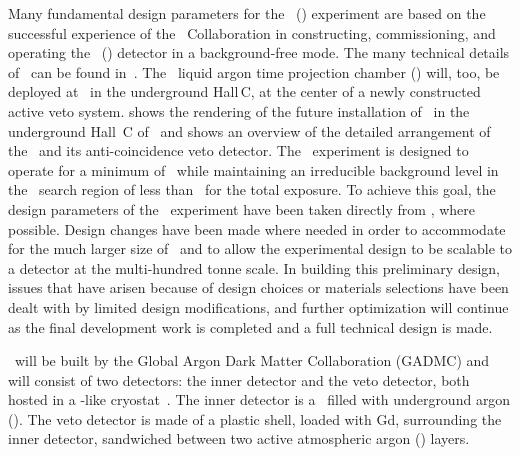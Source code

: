 Many fundamental design parameters for the \DSk\ (\DSks) experiment are based on the successful experience of the \DS\ Collaboration in constructing, commissioning, and operating the \DSf\ (\DSfs) detector in a background-free mode. The many technical details of \DSf\ can be found in~\cite{Agnes:2015gu,Agnes:2016cp,Agnes:2016fw,Agnes:2016fz,Agnes:2016tx,Agnes:2017ck,Agnes:2017cl,Agnes:2017cz,Agnes:2017ec,Agnes:2018cn,Agnes:2018dt,Agnes:2018ep,Agnes:2018fg,Agnes:2018ft}.  The \DSks\ liquid argon time projection chamber (\LArTPC) will, too, be deployed at \LNGS\ in the underground Hall\,C, at the center of a newly constructed active veto system.   shows the rendering of the future installation of \DSks\ in the underground Hall~C of \LNGS\ and  shows an overview of the detailed arrangement of the \LArTPC\ and its anti-coincidence veto detector.  The \DSks\ experiment is designed to operate for a minimum of \DSkExtendedRunTimePlanned\ while maintaining an irreducible background level in the \WIMP\ search region of less than \BackgroundFreeRequirement\ for the total exposure.  To achieve this goal, the design parameters of the \DSks\ experiment have been taken directly from \DSfs, where possible.  Design changes have been made where needed in order to accommodate for the much larger size of \DSks\ and to allow the experimental design to be scalable to a detector at the multi-hundred tonne scale.  In building this preliminary design, issues that have arisen because of design choices or materials selections have been dealt with by limited design modifications, and further optimization will continue as the final development work is completed and a full technical design is made.  

\DSks\ will be built by the Global Argon Dark Matter Collaboration (GADMC) and will consist of two detectors: the inner detector and the veto detector, both hosted in a \pDUNE-like cryostat~\cite{Abi:2017wp,Acciarri:2016wz}.   The inner detector is a \LArTPC\ filled with underground argon (\UAr).  The veto detector is made of a plastic shell, loaded with Gd, surrounding the inner detector, sandwiched between two active atmospheric argon (\AAr) layers.  


